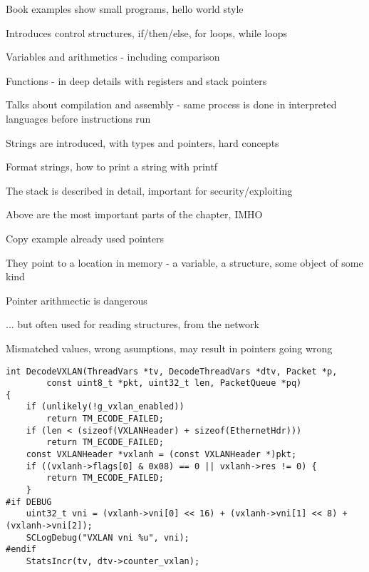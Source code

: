 \documentclass[Screen16to9,17pt]{foils}
\begin{document}
Book examples show small programs, hello world style
\begin{list2}
\item Introduces control structures, if/then/else, for loops, while loops
\item Variables and arithmetics - including comparison
\item Functions - in deep details with registers and stack pointers
\item Talks about compilation and assembly - same process is done in interpreted languages before instructions run
\item Strings are introduced, with types and pointers, hard concepts
\item Format strings, how to print a string with printf
\item The stack is described in detail, important for security/exploiting
\item Above are the most important parts of the chapter, IMHO
\end{list2}









\begin{list2}
\item Copy example already used pointers
\item They point to a location in memory - a variable, a structure, some object of some kind
\item Pointer arithmectic is dangerous
\item ... but often used for reading structures, from the network
\item Mismatched values, wrong asumptions, may result in pointers going wrong
\end{list2}




\begin{verbatim}
int DecodeVXLAN(ThreadVars *tv, DecodeThreadVars *dtv, Packet *p,
        const uint8_t *pkt, uint32_t len, PacketQueue *pq)
{
    if (unlikely(!g_vxlan_enabled))
        return TM_ECODE_FAILED;
    if (len < (sizeof(VXLANHeader) + sizeof(EthernetHdr)))
        return TM_ECODE_FAILED;
    const VXLANHeader *vxlanh = (const VXLANHeader *)pkt;
    if ((vxlanh->flags[0] & 0x08) == 0 || vxlanh->res != 0) {
        return TM_ECODE_FAILED;
    }
#if DEBUG
    uint32_t vni = (vxlanh->vni[0] << 16) + (vxlanh->vni[1] << 8) + (vxlanh->vni[2]);
    SCLogDebug("VXLAN vni %u", vni);
#endif
    StatsIncr(tv, dtv->counter_vxlan);
\end{verbatim}
\end{document}
